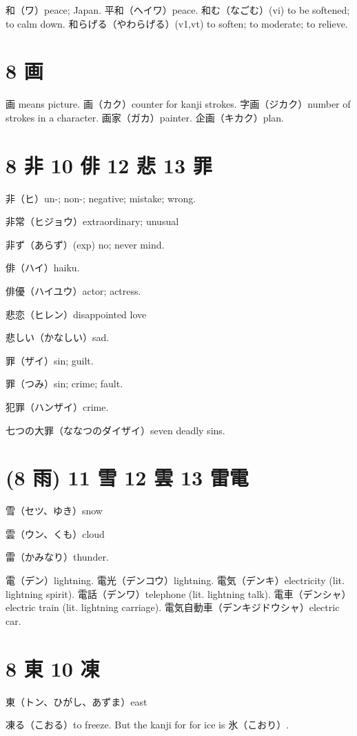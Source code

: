 和（ワ）peace; Japan.
平和（ヘイワ）peace.
和む（なごむ）(vi) to be softened; to calm down.
和らげる（やわらげる）(v1,vt) to soften; to moderate; to relieve.

\section{8 画}

画 means picture.
画（カク）counter for kanji strokes.
字画（ジカク）number of strokes in a character.
画家（ガカ）painter.
企画（キカク）plan.

\section{8 非 10 俳 12 悲 13 罪}

非（ヒ）un-; non-; negative; mistake; wrong.

非常（ヒジョウ）extraordinary; unusual

非ず（あらず）(exp) no; never mind.

俳（ハイ）haiku.

俳優（ハイユウ）actor; actress.

悲恋（ヒレン）disappointed love

悲しい（かなしい）sad.

罪（ザイ）sin; guilt.

罪（つみ）sin; crime; fault.

犯罪（ハンザイ）crime.

七つの大罪（ななつのダイザイ）seven deadly sins.

\section{(8 雨) 11 雪 12 雲 13 雷電}

雪（セツ、ゆき）snow

雲（ウン、くも）cloud

雷（かみなり）thunder.

電（デン）lightning.
電光（デンコウ）lightning.
電気（デンキ）electricity (lit. lightning spirit).
電話（デンワ）telephone (lit. lightning talk).
電車（デンシャ）electric train (lit. lightning carriage).
電気自動車（デンキジドウシャ）electric car.

\section{8 東 10 凍}

東（トン、ひがし、あずま）east

凍る（こおる）to freeze.
But the kanji for for ice is 氷（こおり）.
